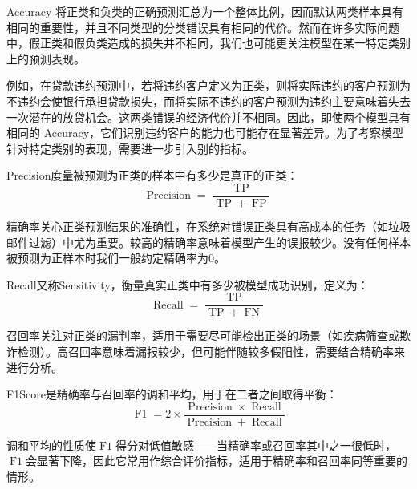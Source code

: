 Accuracy 将正类和负类的正确预测汇总为一个整体比例，因而默认两类样本具有相同的重要性，并且不同类型的分类错误具有相同的代价。然而在许多实际问题中，假正类和假负类造成的损失并不相同，我们也可能更关注模型在某一特定类别上的预测表现。\par
例如，在贷款违约预测中，若将违约客户定义为正类，则将实际违约的客户预测为不违约会使银行承担贷款损失，而将实际不违约的客户预测为违约主要意味着失去一次潜在的放贷机会。这两类错误的经济代价并不相同。因此，即使两个模型具有相同的 Accuracy，它们识别违约客户的能力也可能存在显著差异。为了考察模型针对特定类别的表现，需要进一步引入别的指标。
\begin{definition}
	\gls{Precision}度量被预测为正类的样本中有多少是真正的正类：
	\begin{equation*}
		\operatorname{Precision}=\frac{\operatorname{TP}}{\operatorname{TP}+\operatorname{FP}}
	\end{equation*}
\end{definition}
\begin{note}
 	精确率关心正类预测结果的准确性，在系统对错误正类具有高成本的任务（如垃圾邮件过滤）中尤为重要。较高的精确率意味着模型产生的误报较少。没有任何样本被预测为正样本时我们一般约定精确率为$0$。
\end{note}
\begin{definition}
	\gls{Recall}又称\gls{Sensitivity}，衡量真实正类中有多少被模型成功识别，定义为：
	\begin{equation*}
		\operatorname{Recall}=\frac{\operatorname{TP}}{\operatorname{TP}+\operatorname{FN}}
	\end{equation*}
\end{definition}
\begin{note}
	召回率关注对正类的漏判率，适用于需要尽可能检出正类的场景（如疾病筛查或欺诈检测）。高召回率意味着漏报较少，但可能伴随较多假阳性，需要结合精确率来进行分析。
\end{note}
\begin{definition}
	\gls{F1Score}是精确率与召回率的调和平均，用于在二者之间取得平衡：
	\begin{equation*}
		\operatorname{F1}=2\times\frac{\operatorname{Precision}\times\operatorname{Recall}}{\operatorname{Precision}+\operatorname{Recall}}
	\end{equation*}
\end{definition}
\begin{note}
	调和平均的性质使$\operatorname{F1}$得分对低值敏感——当精确率或召回率其中之一很低时，$\operatorname{F1}$会显著下降，因此它常用作综合评价指标，适用于精确率和召回率同等重要的情形。
\end{note}
